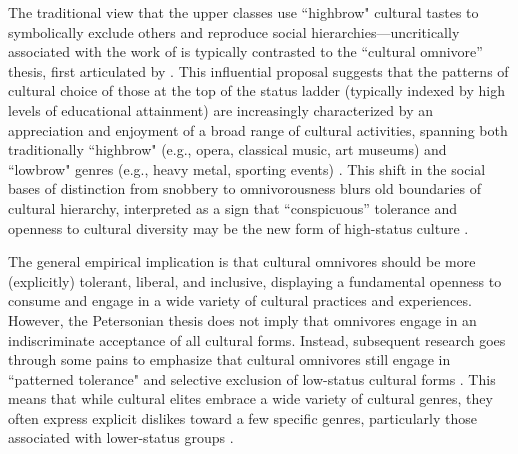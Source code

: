 \documentclass[12pt]{article}
\begin{document}
The traditional view that the upper classes use ``highbrow" cultural tastes to symbolically exclude others and reproduce social hierarchies---uncritically associated with the work of \citep{bourdieu1984distinction-835} is typically contrasted to the ``cultural omnivore'' thesis, first articulated by \citet{peterson1992understanding-ce3}. This influential proposal suggests that the patterns of cultural choice of those at the top of the status ladder (typically indexed by high levels of educational attainment) are increasingly characterized by an appreciation and enjoyment of a broad range of cultural activities, spanning both traditionally ``highbrow" (e.g., opera, classical music, art museums) and ``lowbrow" genres (e.g., heavy metal, sporting events) \citep{peterson1996changing-967, goldberg2011mapping-77a, lizardo2012reconceptualizing-8ff}. This shift in the social bases of distinction from snobbery to omnivorousness blurs old boundaries of cultural hierarchy, interpreted as a sign that ``conspicuous'' tolerance and openness to cultural diversity may be the new form of high-status culture \citep{ollivier2008modes-96f}. 

The general empirical implication is that cultural omnivores should be more (explicitly) tolerant, liberal, and inclusive, displaying a fundamental openness to consume and engage in a wide variety of cultural practices and experiences. However, the Petersonian thesis does not imply that omnivores engage in an indiscriminate acceptance of all cultural forms. Instead, subsequent research goes through some pains to emphasize that cultural omnivores still engage in ``patterned tolerance" and selective exclusion of low-status cultural forms \citep{bryson1996anything-311, lindblom2019anything-530}. This means that while cultural elites embrace a wide variety of cultural genres, they often express explicit dislikes toward a few specific genres, particularly those associated with lower-status groups \citep{bryson1996anything-311, lindblom2022growing-ded}. 
\end{document}
